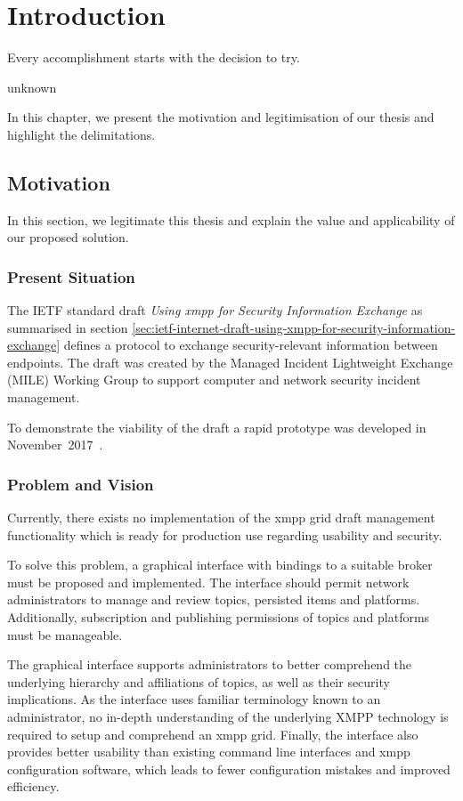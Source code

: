 \newcommand{\code}{\texttt}
\chapter{Introduction}
\label{sec:introduction}

\epigraph{Every accomplishment starts with the decision to try.}{unknown}
In this chapter, we present the motivation and legitimisation of our thesis and highlight the delimitations.

\section{Motivation}
In this section, we legitimate this thesis and explain the value and applicability of our proposed solution.

\subsection{Present Situation}
The IETF standard draft \emph{Using \gls{xmpp} for Security Information Exchange} \cite{ietf-mile-xmpp-grid-05} as summarised in section \ref{sec:ietf-internet-draft-using-xmpp-for-security-information-exchange} defines a protocol to exchange security-relevant information between endpoints.
The draft was created by the Managed Incident Lightweight Exchange (MILE) Working Group to support computer and network security incident management.

To demonstrate the viability of the draft a rapid prototype was developed in November~2017~\cite{xmpp-grid-prototype}.

\subsection{Problem and Vision}
Currently, there exists no implementation of the \gls{xmpp} grid draft management functionality which is ready for production use regarding usability and security.

To solve this problem, a graphical interface with bindings to a suitable \gls{broker} must be proposed and implemented.
The interface should permit network administrators to manage and review \glspl{topic}, persisted items and \glspl{platform}.
Additionally, subscription and publishing permissions of \glspl{topic} and \glspl{platform} must be manageable.

The graphical interface supports administrators to better comprehend the underlying hierarchy and affiliations of \glspl{topic}, as well as their security implications.
As the interface uses familiar terminology known to an administrator, no in-depth understanding of the underlying XMPP technology is required to setup and comprehend an \gls{xmpp} grid.
Finally, the interface also provides better usability than existing command line interfaces and \gls{xmpp} configuration software, which leads to fewer configuration mistakes and improved efficiency.

